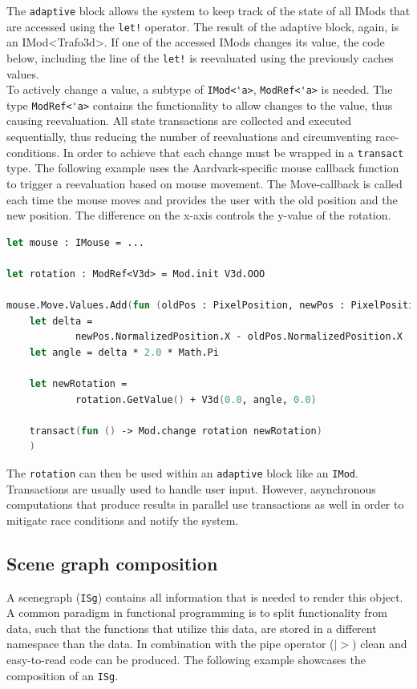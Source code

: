 The \verb|adaptive| block allows the system to keep track of the state of all IMods that are accessed using the \verb|let!| operator. The result of the adaptive block, again, is an IMod<Trafo3d>. If one of the accessed IMods changes its value, the code below, including the line of the \verb|let!| is reevaluated using the previously caches values. 
\\

To actively change a value, a subtype of \verb|IMod<'a>|, \verb|ModRef<'a>| is needed. The type \verb|ModRef<'a>| contains the functionality to allow changes to the value, thus causing reevaluation. All state transactions are collected and executed sequentially, thus reducing the number of reevaluations and circumventing race-conditions. In order to achieve that each change must be wrapped in a \verb|transact| type. 
The following example uses the Aardvark-specific mouse callback function to trigger a reevaluation based on mouse movement. The Move-callback is called each time the mouse moves and provides the user with the old position and the new position. The difference on the x-axis controls the y-value of the rotation. 

\begin{lstlisting}[language = FSharp]
let mouse : IMouse = ...

let rotation : ModRef<V3d> = Mod.init V3d.OOO

mouse.Move.Values.Add(fun (oldPos : PixelPosition, newPos : PixelPosition) -> 
    let delta = 
			newPos.NormalizedPosition.X - oldPos.NormalizedPosition.X
    let angle = delta * 2.0 * Math.Pi
    
    let newRotation = 
			rotation.GetValue() + V3d(0.0, angle, 0.0)
    
    transact(fun () -> Mod.change rotation newRotation)
    )
\end{lstlisting}

The \verb|rotation| can then be used within an \verb|adaptive| block like an \verb|IMod|. 
\\
Transactions are usually used to handle user input. However, asynchronous computations that produce results in parallel use transactions as well in order to mitigate race conditions and notify the system. 


\subsection{Scene graph composition}
\label{sec:isg}

A scenegraph (\verb|ISg|) contains all information that is needed to render this object. A common paradigm in functional programming is to split functionality from data, such that the functions that utilize this data, are stored in a different namespace than the data. In combination with the pipe operator ($|>$) clean and easy-to-read code can be produced. The following example showcases the composition of an \verb|ISg|. 

